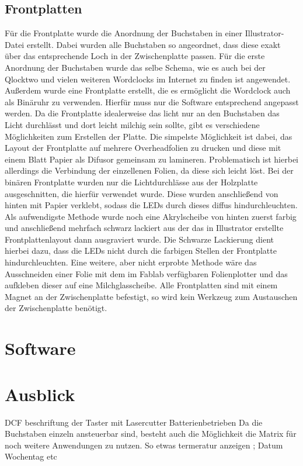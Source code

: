 \documentclass[12pt,journal,compsoc]{IEEEtran}
\begin{document}
\subsection{Frontplatten}
Für die Frontplatte wurde die Anordnung der Buchstaben in einer Illustrator-Datei erstellt. Dabei wurden alle Buchstaben so angeordnet, dass diese exakt über das entsprechende Loch in der Zwischenplatte passen. Für die erste Anordnung der Buchstaben wurde das selbe Schema, wie es auch bei der Qlocktwo und vielen weiteren Wordclocks im Internet zu finden ist angewendet. Außerdem wurde eine Frontplatte erstellt, die es ermöglicht die Wordclock auch als Binäruhr zu verwenden. Hierfür muss nur die Software entsprechend angepasst werden. Da die Frontplatte idealerweise das licht nur an den Buchstaben das Licht durchlässt und dort leicht milchig sein sollte, gibt es  verschiedene Möglichkeiten zum Erstellen der Platte. Die simpelste Möglichkeit ist dabei, das Layout der Frontplatte auf mehrere Overheadfolien zu drucken und diese mit einem Blatt Papier als Difusor gemeinsam zu lamineren. Problematisch ist hierbei allerdings die Verbindung der einzellenen Folien, da diese sich leicht löst. Bei der binären Frontplatte wurden nur die Lichtdurchlässe aus der Holzplatte ausgeschnitten, die hierfür verwendet wurde. Diese wurden anschließend von hinten mit Papier verklebt, sodass die LEDs durch dieses diffus hindurchleuchten. Als aufwendigste Methode wurde noch eine Akrylscheibe von hinten zuerst farbig und anschließend mehrfach schwarz lackiert aus der das in Illustrator erstellte Frontplattenlayout dann ausgraviert wurde. Die Schwarze Lackierung dient hierbei dazu, dass die LEDs nicht durch die farbigen Stellen der Frontplatte hindurchleuchten. Eine weitere, aber nicht erprobte Methode wäre das Ausschneiden einer Folie mit dem im Fablab verfügbaren Folienplotter und das aufkleben dieser auf eine Milchglasscheibe. Alle Frontplatten sind mit einem Magnet an der Zwischenplatte befestigt, so wird kein Werkzeug zum Austauschen der Zwischenplatte benötigt.
\section{Software}

\section{Ausblick}
DCF
beschriftung der Taster mit Lasercutter
Batterienbetrieben
Da die Buchstaben  einzeln ansteuerbar sind, besteht auch die Möglichkeit die Matrix für noch weitere Anwendungen zu nutzen. So  etwas termeratur anzeigen ; Datum Wochentag etc

\nocite{*}
%
%





\end{document}
